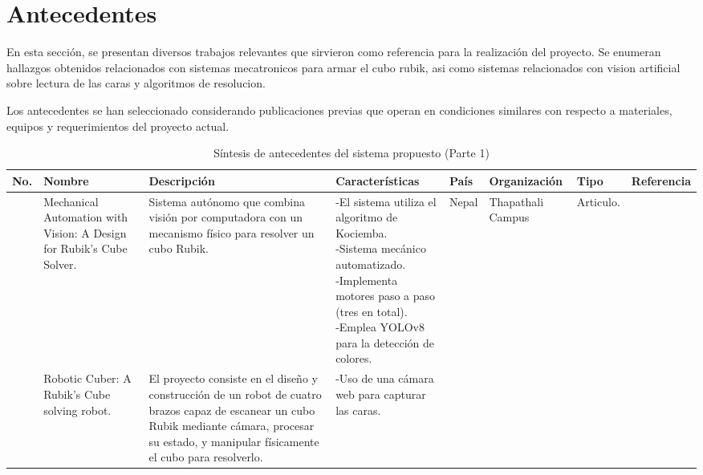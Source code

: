 \section{Antecedentes}

\label{Antecedentes}
En esta sección, se presentan diversos trabajos relevantes que sirvieron como referencia para la realización del proyecto. Se enumeran hallazgos obtenidos relacionados con sistemas mecatronicos para armar el cubo rubik, asi como sistemas relacionados con vision artificial sobre lectura de las caras y algoritmos de resolucion.

Los antecedentes se han seleccionado considerando publicaciones previas que operan en condiciones similares con respecto a materiales, equipos y requerimientos del proyecto actual. 


\begin{sidewaystable}
  \scriptsize
  \centering
  \caption{ Síntesis de antecedentes del sistema propuesto (Parte 1)}
  \begin{tabular}{m{5mm} m{25mm} m{45mm} m{40mm} m{15mm} m{18mm} m{12mm} m{14mm}}
    \toprule
    \centering \textbf{No.} & \centering \textbf{Nombre} & \centering \textbf{Descripción} & \centering \textbf{Características} & \centering \textbf{País} & \centering \textbf{Organización} & \centering \textbf{Tipo} & \textbf{Referencia} \\ 
    \midrule
    \centering 1 & \centering Mechanical Automation with Vision: A Design for Rubik’s Cube Solver. & 
    \parbox{45mm}{Sistema autónomo que combina visión por computadora con un mecanismo físico para resolver un cubo Rubik.} & 
    \parbox{40mm}{
        -El sistema utiliza el algoritmo de Kociemba.\\
        -Sistema mecánico automatizado.\\
        -Implementa motores paso a paso (tres en total).\\
        -Emplea YOLOv8 para la detección de colores.\\} & 
    \centering Nepal & \centering Thapathali Campus & \centering Articulo. &  \\ 
    \midrule
     & \centering Robotic Cuber: A Rubik’s Cube solving robot. & \parbox{45mm}{El proyecto consiste en el diseño y construcción de un robot de cuatro brazos capaz de escanear un cubo Rubik mediante cámara, procesar su estado, y manipular físicamente el cubo para resolverlo.} & 
    \parbox{40mm}{
    -Uso de una cámara web para capturar las caras.\\
}
\end{tabular}
\end{sidewaystable}
